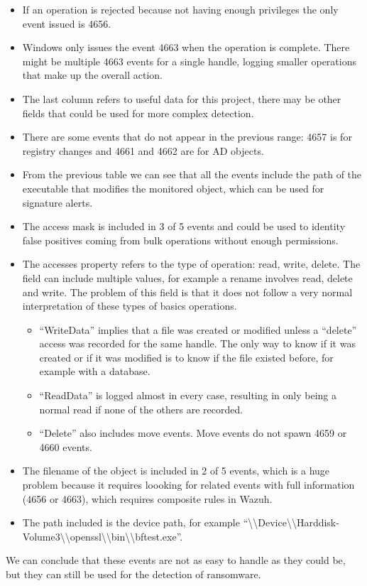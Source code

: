 \begin{itemize}
	\item If an operation is rejected because not having enough privileges the only event issued is 4656.
	\item Windows only issues the event 4663 when the operation is complete. There might be multiple 4663 events for a single handle, logging smaller operations that make up the overall action.
	\item The last column refers to useful data for this project, there may be other fields that could be used for more complex detection.
	\item There are some events that do not appear in the previous range: 4657 is for registry changes and 4661 and 4662 are for AD objects.
	\item From the previous table we can see that all the events include the path of the executable that modifies the monitored object, which can be used for signature alerts.
	\item The access mask is included in 3 of 5 events and could be used to identity false positives coming from bulk operations without enough permissions.
	\item The accesses property refers to the type of operation: read, write, delete.
		The field can include multiple values, for example a rename involves read, delete and write.
		The problem of this field is that it does not follow a very normal interpretation of these types of basics operations.
	\begin{itemize}
		\item``WriteData'' implies that a file was created or modified unless a ``delete'' access was recorded for the same handle. The only way to know if it was created or if it was modified is to know if the file existed before, for example with a database.
		\item``ReadData'' is logged almost in every case, resulting in only being a normal read if none of the others are recorded.
		\item``Delete'' also includes move events. Move events do not spawn 4659 or 4660 events.
	\end{itemize}
	\item The filename of the object is included in 2 of 5 events, which is a huge problem because it requires loooking for related events with full information (4656 or 4663), which requires composite rules in Wazuh.
	\item The path included is the device path, for example ``{\textbackslash}{\textbackslash}Device{\textbackslash}{\textbackslash}Harddisk- Volume3{\textbackslash}{\textbackslash}openssl{\textbackslash}{\textbackslash}bin{\textbackslash}{\textbackslash}bftest.exe''.
\end{itemize}
\linej
We can conclude that these events are not as easy to handle as they could be, but they can still be used for the detection of ransomware.

